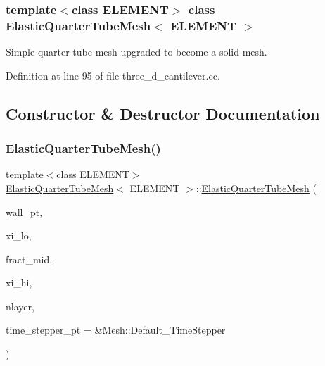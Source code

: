 \subsubsection*{template$<$class E\+L\+E\+M\+E\+NT$>$\newline
class Elastic\+Quarter\+Tube\+Mesh$<$ E\+L\+E\+M\+E\+N\+T $>$}

Simple quarter tube mesh upgraded to become a solid mesh. 

Definition at line 95 of file three\+\_\+d\+\_\+cantilever.\+cc.



\subsection{Constructor \& Destructor Documentation}
\mbox{\label{classElasticQuarterTubeMesh_abb82781bc4c1dc04bdfae437baf49830}} 
\subsubsection{\texorpdfstring{Elastic\+Quarter\+Tube\+Mesh()}{ElasticQuarterTubeMesh()}}
{\footnotesize\ttfamily template$<$class E\+L\+E\+M\+E\+NT$>$ \\
\hyperlink{classElasticQuarterTubeMesh}{Elastic\+Quarter\+Tube\+Mesh}$<$ E\+L\+E\+M\+E\+NT $>$\+::\hyperlink{classElasticQuarterTubeMesh}{Elastic\+Quarter\+Tube\+Mesh} (\begin{DoxyParamCaption}\item[{Geom\+Object $\ast$}]{wall\+\_\+pt,  }\item[{const Vector$<$ double $>$ \&}]{xi\+\_\+lo,  }\item[{const double \&}]{fract\+\_\+mid,  }\item[{const Vector$<$ double $>$ \&}]{xi\+\_\+hi,  }\item[{const unsigned \&}]{nlayer,  }\item[{Time\+Stepper $\ast$}]{time\+\_\+stepper\+\_\+pt = {\ttfamily \&Mesh\+:\+:Default\+\_\+TimeStepper} }\end{DoxyParamCaption})\hspace{0.3cm}{\ttfamily [inline]}}



